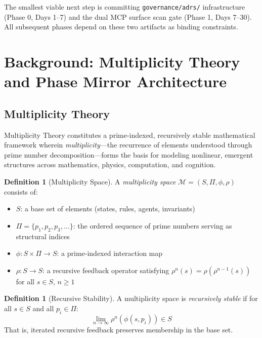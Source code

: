 \documentclass[12pt,a4paper]{article}
\theoremstyle{definition}
\newtheorem{definition}[theorem]{Definition}
\theoremstyle{remark}
\begin{document}
The smallest viable next step is committing \texttt{governance/adrs/} infrastructure
(Phase 0, Days 1--7) and the dual MCP surface scan gate (Phase 1, Days 7--30).
All subsequent phases depend on these two artifacts as binding constraints.


\section{Background: Multiplicity Theory and Phase Mirror Architecture}

\subsection{Multiplicity Theory}

Multiplicity Theory constitutes a prime-indexed, recursively stable mathematical
framework wherein \emph{multiplicity}---the recurrence of elements understood
through prime number decomposition---forms the basis for modeling nonlinear,
emergent structures across mathematics, physics, computation, and cognition.

\begin{definition}[Multiplicity Space]
A \emph{multiplicity space} $\mathcal{M} = (S, \Pi, \phi, \rho)$ consists of:
\begin{itemize}
  \item $S$: a base set of elements (states, rules, agents, invariants)
  \item $\Pi = \{p_1, p_2, p_3, \ldots\}$: the ordered sequence of prime numbers
    serving as structural indices
  \item $\phi: S \times \Pi \rightarrow S$: a prime-indexed interaction map
  \item $\rho: S \rightarrow S$: a recursive feedback operator satisfying
    $\rho^n(s) = \rho(\rho^{n-1}(s))$ for all $s \in S$, $n \geq 1$
\end{itemize}
\end{definition}

\begin{definition}[Recursive Stability]
A multiplicity space is \emph{recursively stable} if for all $s \in S$ and
all $p_i \in \Pi$:
\[
  \lim_{n \to \infty} \rho^n(\phi(s, p_i)) \in S
\]
That is, iterated recursive feedback preserves membership in the base set.
\end{definition}
\end{document}
